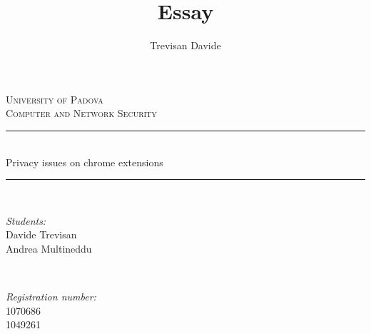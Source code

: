 \documentclass[12pt]{article}
\title{Essay}
\date{}
\author{Trevisan Davide}
\begin{document}
		
		
		
		\begin{titlepage}
			
			\newcommand{\HRule}{\rule{\linewidth}{0.5mm}} %
			
			\center %
			
			
			\textsc{\LARGE University of Padova}\\[1.5cm] %
			\textsc{\Large Computer and Network Security}\\[0.5cm] %
			
			
			\HRule \\[0.4cm]
			{ \huge Privacy issues on chrome extensions}\\[0.3cm]
			\HRule \\[1.5cm]
			
			
			\begin{minipage}{0.4\textwidth}
				\begin{flushleft} \large
					\emph{Students:}\\
					Davide Trevisan\\ %
					Andrea Multineddu\\
				\end{flushleft}
			\end{minipage}
			~
			\begin{minipage}{0.4\textwidth}
				\begin{flushright}\large
					\emph{Registration number:} \\
					\textsc{1070686}\\ %
					\textsc{1049261}\\
				\end{flushright}
			\end{minipage}\\[1cm]
			

\end{titlepage}
\end{document}
